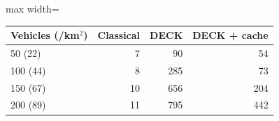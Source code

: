 \begin{adjustbox}{max width=\linewidth}
\begin{tabular}{lrrr}
\toprule
Vehicles (/km$^2$) & Classical & DECK & DECK + cache \\
\midrule
50 (22) & 7 & 90 & 54 \\
100 (44) & 8 & 285 & 73 \\
150 (67) & 10 & 656 & 204 \\
200 (89) & 11 & 795 & 442 \\
\bottomrule
\end{tabular}
\end{adjustbox}
\par{}
